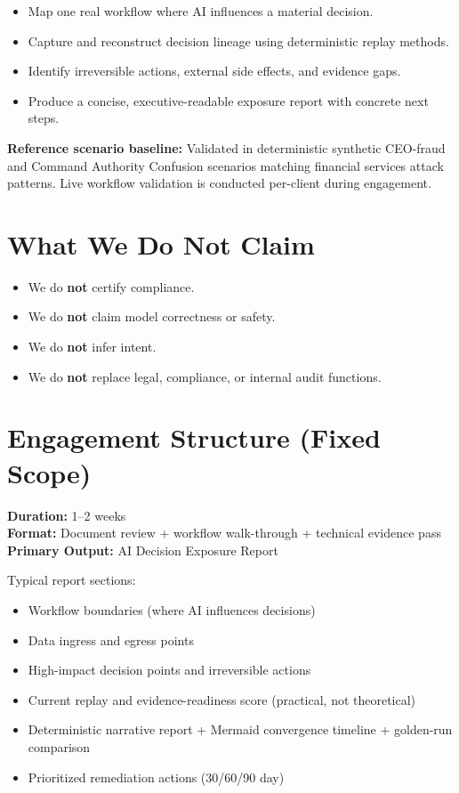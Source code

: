 \documentclass[11pt]{article}
\begin{document}
\begin{itemize}
  \item Map one real workflow where AI influences a material decision.
  \item Capture and reconstruct decision lineage using deterministic replay methods.
  \item Identify irreversible actions, external side effects, and evidence gaps.
  \item Produce a concise, executive-readable exposure report with concrete next steps.
\end{itemize}
\noindent\textbf{Reference scenario baseline:} Validated in deterministic synthetic CEO-fraud and Command Authority Confusion scenarios matching financial services attack patterns. Live workflow validation is conducted per-client during engagement.

\section*{What We Do Not Claim}
\begin{itemize}
  \item We do \textbf{not} certify compliance.
  \item We do \textbf{not} claim model correctness or safety.
  \item We do \textbf{not} infer intent.
  \item We do \textbf{not} replace legal, compliance, or internal audit functions.
\end{itemize}

\section*{Engagement Structure (Fixed Scope)}
\textbf{Duration:} 1--2 weeks\\
\textbf{Format:} Document review + workflow walk-through + technical evidence pass\\
\textbf{Primary Output:} AI Decision Exposure Report

\medskip
\noindent Typical report sections:
\begin{itemize}
  \item Workflow boundaries (where AI influences decisions)
  \item Data ingress and egress points
  \item High-impact decision points and irreversible actions
  \item Current replay and evidence-readiness score (practical, not theoretical)
  \item Deterministic narrative report + Mermaid convergence timeline + golden-run comparison
  \item Prioritized remediation actions (30/60/90 day)
\end{itemize}
\end{document}
